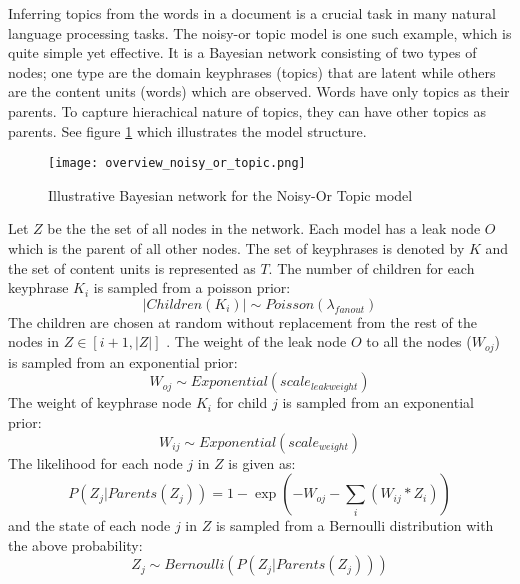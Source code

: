 \documentclass[../main.tex]{subfiles}
\begin{document}
Inferring topics from the words in a document is a crucial task in many natural language processing tasks.
The noisy-or topic model\cite{liu2016representing} is one such example, which is quite simple yet effective.
It is a Bayesian network consisting of two types of nodes; one type are the domain keyphrases (topics) that are latent while others are the content units (words) which are observed.
Words have only topics as their parents. To capture hierachical nature of topics, they can have other topics as parents.
See figure \ref{fig:fig3} which illustrates the model structure. \newline
\begin{figure}[h]
  \centering
  \texttt{[image: overview\_noisy\_or\_topic.png]}
  \caption{Illustrative Bayesian network for the Noisy-Or Topic model\cite{liu2016representing}}
  \label{fig:fig3}
\end{figure}

Let $Z$ be the the set of all nodes in the network.
Each model has a leak node $O$ which is the parent of all other nodes.
The set of keyphrases is denoted by $K$ and the set of content units is represented as $T$.
The number of children for each keyphrase $K_i$ is sampled from a poisson prior:
$$
|Children(K_i)| \sim Poisson(\lambda_{fanout})
$$
The children are chosen at random without replacement from the rest of the nodes in $Z \in [i+1,|Z|]$
. The weight of the leak node $O$ to all the nodes ($W_{oj}$) is sampled from an exponential prior:
$$
W_{oj} \sim Exponential(scale_{leak weight})
$$
The weight of keyphrase node $K_i$ for child $j$ is sampled from an exponential prior:
$$
W_{ij} \sim Exponential(scale_{weight})
$$
The likelihood for each node $j$ in $Z$ is given as:
$$
P(Z_j|Parents(Z_j)) = 1 - \exp(-W_{oj} -\sum_{i}(W_{ij} * Z_i))
$$
and the state of each node $j$ in $Z$ is sampled from a Bernoulli distribution with the above probability:
$$
Z_j \sim Bernoulli(P(Z_j|Parents(Z_j)))
$$
\end{document}
